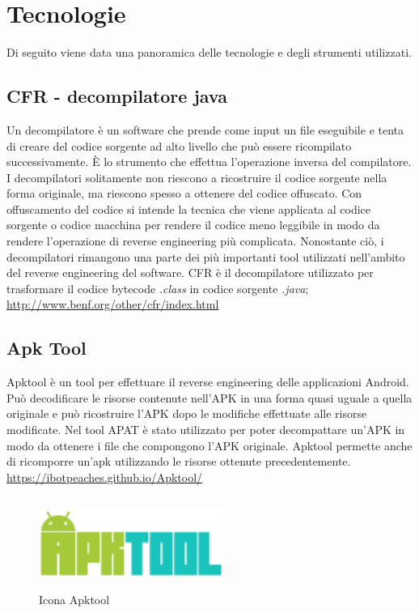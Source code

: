 
\section{Tecnologie}\label{sec:tecnologie}
Di seguito viene data una panoramica delle tecnologie e degli strumenti utilizzati.

\subsection*{CFR - decompilatore java}
Un decompilatore è un software che prende come input un file eseguibile e tenta di creare del codice sorgente ad alto livello che può essere ricompilato successivamente.
È lo strumento che effettua l'operazione inversa del compilatore.
I decompilatori solitamente non riescono a ricostruire il codice sorgente nella forma originale, ma riescono spesso a ottenere del codice offuscato.
Con offuscamento del codice si intende la tecnica che viene applicata al codice sorgente o codice macchina per rendere il codice meno leggibile in modo da rendere l'operazione di reverse engineering più complicata.
Nonostante ciò, i decompilatori rimangono una parte dei più importanti tool
utilizzati nell'ambito del reverse engineering del software.
CFR è il decompilatore utilizzato per trasformare il codice bytecode \textit{.class} in codice sorgente \textit{.java};
\url{http://www.benf.org/other/cfr/index.html}

\subsection*{Apk Tool}
Apktool è un tool per effettuare il reverse engineering delle applicazioni Android.
Può decodificare le risorse contenute nell'APK in una forma quasi uguale a quella originale e può ricostruire l'APK dopo le modifiche effettuate alle risorse modificate.
Nel tool APAT è stato utilizzato per poter decompattare un'APK in modo da ottenere i file che compongono l'APK originale.
Apktool permette anche di ricomporre un'apk utilizzando le risorse ottenute precedentemente.
\url{https://ibotpeaches.github.io/Apktool/}
\begin{figure}[H]
    \centering
    \includegraphics[width=6cm, height=3cm]{./immagini/apktool.png}
    \caption{Icona Apktool}\label{fig:apktool}
\end{figure}

